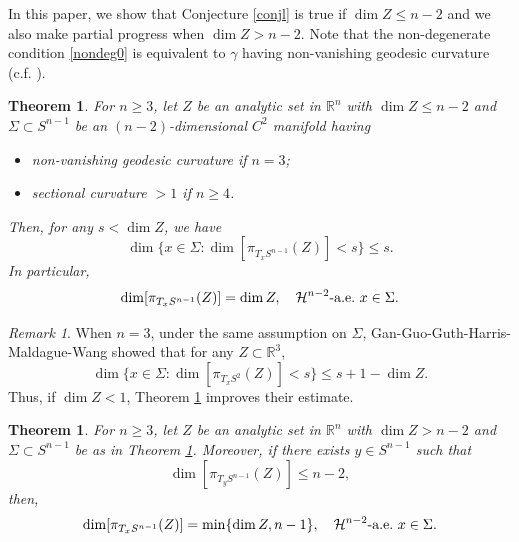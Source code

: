 \documentclass[11pt,a4paper,reqno]{amsart}
\newcommand{\R}{\mathbb{R}}
\newcommand{\calH}{\mathcal{H}}
\newcommand{\1}{\mathbf{1}}
\numberwithin{equation}{section}
\theoremstyle{plain}
\newtheorem{thm}[equation]{Theorem}
\theoremstyle{definition}
\theoremstyle{remark}
\newtheorem{remark}[equation]{Remark}
\begin{document}
In this paper, we show that Conjecture \ref{conjl} is true if $\dim Z \le n-2$ and  we also make partial progress when $\dim Z >n-2$. Note that the non-degenerate condition \eqref{nondeg0} is equivalent to $\gamma$ having non-vanishing geodesic curvature (c.f. \cite[Page 3]{LIU2025}).

\begin{thm}\label{planemain}
For $n \ge 3$, let $Z$ be an analytic set in $\R^n$ with $\dim Z \le n-2$ and $\Sigma \subset S^{n-1}$ be an $(n-2)$-dimensional $C^2$ manifold having
\begin{itemize}
  \item non-vanishing geodesic curvature if $n=3$;
  \item sectional curvature $>1$ if $n \ge 4$.
\end{itemize}
Then, for any $s < \dim Z$, we have
  $$  \dim \{ x \in \Sigma : \dim [\pi_{T_{x}S^{n-1}}(Z)] < s  \} \le s.  $$
  In particular,
\begin{equation*}
   \dim [\pi_{T_{x}S^{n-1}}(Z)]  = \dim Z, \quad \calH^{n-2} \mbox{-\rm a.e.} \ x \in \Sigma.
\end{equation*}
\end{thm}

\begin{remark} \label{rmkmain0}
  When $n=3$, under the same assumption on $\Sigma$, Gan-Guo-Guth-Harris-Maldague-Wang \cite[Theorem 1]{gan2024} showed that for any $Z\subset \R^3$,
    $$  \dim \{ x \in \Sigma : \dim [\pi_{T_{x}S^{2}}(Z)] < s  \} \le s + 1-\dim Z.  $$
  Thus, if $\dim Z < 1$, Theorem \ref{planemain} improves their estimate.
\end{remark}

\begin{thm}\label{cormain}
For $n \ge 3$, let $Z$ be an analytic set in $\R^n$ with $\dim Z > n-2$ and $\Sigma \subset S^{n-1}$ be as in Theorem \ref{planemain}.
Moreover, if there exists $y \in S^{n-1}$ such that
   \begin{equation}\label{le1}
     \dim[\pi_{T_{y}S^{n-1}}(Z)] \le n-2,
   \end{equation}
  then,
  \begin{equation*}
   \dim [\pi_{T_{x}S^{n-1}}(Z)]  = \min\{\dim Z, n-1 \}, \quad \calH^{n-2} \mbox{-\rm a.e.} \ x \in \Sigma.
\end{equation*}
\end{thm}
\end{document}
